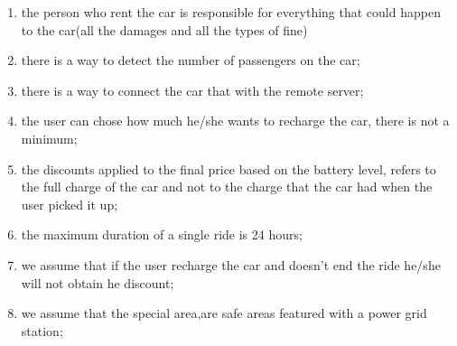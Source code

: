 \begin{enumerate}
	\item the person who rent the car is responsible for everything that could happen to the car(all the damages and all the types of fine)
	\item there is a way to detect the number of passengers on the car;
	\item there is a way to connect the car  that with the remote server;
	\item the user can chose how much he/she wants to recharge the car, there is not a minimum;
	\item the discounts applied to the final price based on the battery level, refers to the full charge of the car and not to the charge that the car had when the user picked it up;
	\item the maximum duration of a single ride is 24 hours;
	\item we assume that if the user recharge the car and doesn't end the ride he/she will not obtain he discount;
	\item we assume that the special area,are safe areas featured with a power grid station;
\end{enumerate}